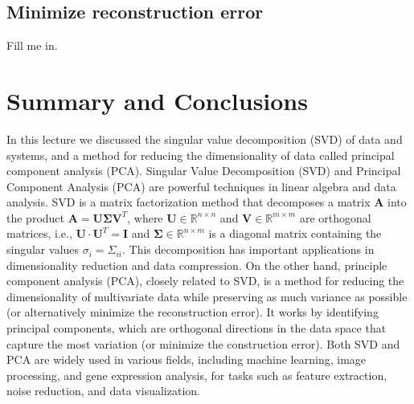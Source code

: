 \documentclass{article}[11pt]
\begin{document}
\subsection*{Minimize reconstruction error}
Fill me in.

\section{Summary and Conclusions}
In this lecture we discussed the singular value decomposition (SVD) of data and systems, and a method for reducing the dimensionality of data called principal component analysis (PCA).
Singular Value Decomposition (SVD) and Principal Component Analysis (PCA) are powerful techniques in linear algebra and data analysis. 
SVD is a matrix factorization method that decomposes a matrix $\mathbf{A}$ into the product $\mathbf{A} = \mathbf{U}\mathbf{\Sigma}\mathbf{V}^{T}$, where
$\mathbf{U}\in\mathbb{R}^{n\times{n}}$ and $\mathbf{V}\in\mathbb{R}^{m\times{m}}$ are orthogonal matrices, i.e., $\mathbf{U}\cdot\mathbf{U}^{T} = \mathbf{I}$ and $\mathbf{\Sigma}\in\mathbb{R}^{n\times{m}}$ 
is a diagonal matrix containing the singular values $\sigma_{i}=\Sigma_{ii}$.
This decomposition has important applications in dimensionality reduction and data compression. 
On the other hand, principle component analysis (PCA), closely related to SVD, 
is a method for reducing the dimensionality of multivariate data while preserving as much variance as possible (or alternatively minimize the reconstruction error). 
It works by identifying principal components, which are orthogonal directions in the data space that capture the most variation (or minimize the construction error). 
Both SVD and PCA are widely used in various fields, including machine learning, image processing, and gene expression analysis, 
for tasks such as feature extraction, noise reduction, and data visualization.


\end{document}
